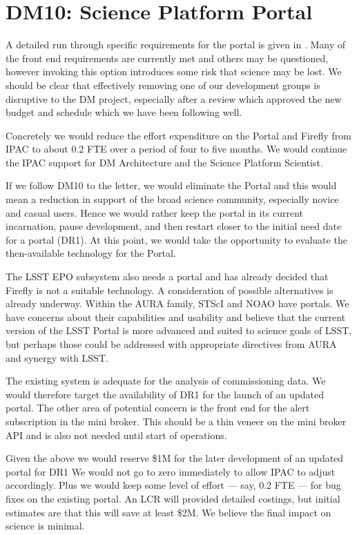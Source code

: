 \section{DM10: Science Platform Portal}\label{sect:dm10}

A detailed run through specific requirements for the portal is given in .
Many of the front end requirements are currently met and others may be questioned, however invoking this option introduces some risk that science may be lost.
We should be clear that effectively removing one of our development groups is disruptive to the DM project,
 especially after a
review which approved the new budget and schedule which we have been following well.

Concretely we would reduce the effort expenditure on the Portal and Firefly from IPAC to about 0.2 FTE over a period of four to five months.
We would continue the IPAC support for DM Architecture and the Science Platform Scientist.

If we follow DM10 to the letter, we would eliminate the Portal and this would mean a reduction in support of the broad science community,
especially novice and casual users.
Hence we would rather keep the portal in its current incarnation, pause development, and then restart closer
to the initial need date for a portal (DR1).
At this point, we would take the opportunity to evaluate the then-available technology for the Portal.

The LSST EPO subsystem also needs a portal and has already decided that
Firefly is not a suitable technology. A consideration of possible alternatives
is already underway.
Within the AURA family, STScI and NOAO have portals.
We have concerns about their capabilities and usability
and believe that the current version of the LSST Portal is more advanced and suited to science goals of LSST,
but perhaps those could be addressed with appropriate directives from AURA and synergy with LSST.

The existing system is adequate for the analysis of commissioning data.
We would therefore target the availability of DR1 for the launch of an updated
portal.
The other area of potential concern is the front end for the alert subscription in the mini broker.
This should be a thin veneer on the mini broker API and is also not needed until start of operations.

Given the above we would reserve \$1M for the later development of an updated portal for DR1
We would not go to zero immediately to allow IPAC to adjust accordingly.
Plus we would keep some level of effort --- say, 0.2 FTE --- for bug fixes on the existing portal.
An LCR will provided detailed costings, but initial estimates are that this will save at least \$2M.
We believe the final impact on science is minimal.
